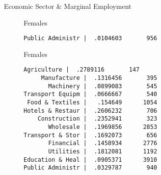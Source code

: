 \documentclass{beamer}
\begin{document}
\begin{frame}[fragile]{Economic Sector \& Marginal Employment}
\begin{figure}
\begin{minipage}[b]{0.4\textwidth}{Females}
\begin{Verbatim}[fontsize=\tiny]
Public Administr |  .0104603       956
\end{Verbatim}
\end{minipage}
\begin{minipage}[b]{0.4\textwidth}{Females}
\begin{Verbatim}[fontsize=\tiny]
     Agriculture |  .2789116       147
     Manufacture |  .1316456       395
       Machinery |  .0899083       545
Transport Equipm |  .0666667       540
 Food & Textiles |   .154649      1054
Hotels & Restaur |  .2606232       706
    Construction |  .2352941       323
       Wholesale |  .1969856      2853
Transport & Stor |  .1692073       656
       Financial |  .1458934      2776
       Utilities |  .1812081      1192
Education & Heal |  .0905371      3910
Public Administr |  .0329787       940
\end{Verbatim}
\end{minipage}
\end{figure}
\end{frame}
\end{document}
